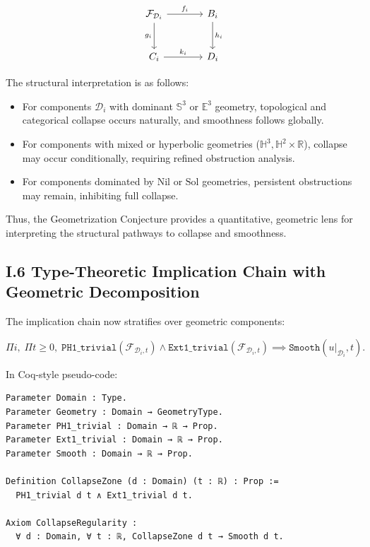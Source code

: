\documentclass[11pt]{article}
\begin{document}
\[
\begin{tikzcd}[row sep=large, column sep=large]
\mathcal{F}_{\mathcal{D}_i}
  \arrow[r, "f_i"]
  \arrow[d, "g_i"']
& B_i
  \arrow[d, "h_i"] \\
C_i
  \arrow[r, "k_i"]
& D_i
\end{tikzcd}
\]

The structural interpretation is as follows:

\begin{itemize}
  \item For components \( \mathcal{D}_i \) with dominant \( \mathbb{S}^3 \) or \( \mathbb{E}^3 \) geometry, topological and categorical collapse occurs naturally, and smoothness follows globally.
  \item For components with mixed or hyperbolic geometries (\( \mathbb{H}^3, \mathbb{H}^2 \times \mathbb{R} \)), collapse may occur conditionally, requiring refined obstruction analysis.
  \item For components dominated by \( \mathrm{Nil} \) or \( \mathrm{Sol} \) geometries, persistent obstructions may remain, inhibiting full collapse.
\end{itemize}

Thus, the Geometrization Conjecture provides a quantitative, geometric lens for interpreting the structural pathways to collapse and smoothness.

\subsection*{I.6 Type-Theoretic Implication Chain with Geometric Decomposition}

The implication chain now stratifies over geometric components:

\[
\Pi i,\; \Pi t \geq 0,\;
\texttt{PH1\_trivial}(\mathcal{F}_{\mathcal{D}_i, t}) \land \texttt{Ext1\_trivial}(\mathcal{F}_{\mathcal{D}_i, t})
\implies \texttt{Smooth}(u|_{\mathcal{D}_i}, t).
\]

In Coq-style pseudo-code:

\begin{lstlisting}[language=Coq]
Parameter Domain : Type.
Parameter Geometry : Domain → GeometryType.
Parameter PH1_trivial : Domain → ℝ → Prop.
Parameter Ext1_trivial : Domain → ℝ → Prop.
Parameter Smooth : Domain → ℝ → Prop.

Definition CollapseZone (d : Domain) (t : ℝ) : Prop :=
  PH1_trivial d t ∧ Ext1_trivial d t.

Axiom CollapseRegularity :
  ∀ d : Domain, ∀ t : ℝ, CollapseZone d t → Smooth d t.
\end{lstlisting}
\end{document}
